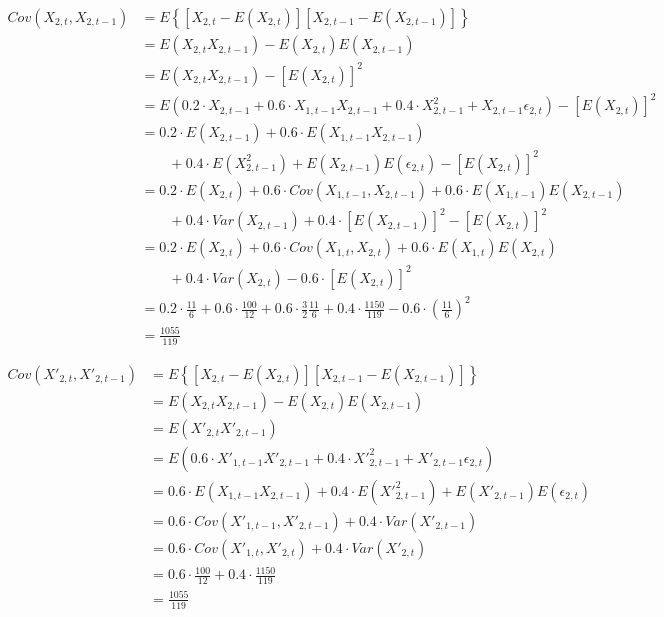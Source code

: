 \begin{solution}
\begin{equation}
\begin{aligned}
Cov(X_{2,t},X_{2,t-1}) 	& = E\left\{[X_{2,t} - E(X_{2,t})][X_{2,t-1} - E(X_{2,t-1})]\right\} \\
												& = E(X_{2,t}X_{2,t-1}) - E(X_{2,t})E(X_{2,t-1}) \\
												& = E(X_{2,t}X_{2,t-1}) - [E(X_{2,t})]^2 \\
												& = E\left(0.2 \cdot X_{2,t-1} + 0.6 \cdot X_{1,t-1}X_{2,t-1}
													+ 0.4 \cdot X_{2,t-1}^2 + X_{2,t-1}\epsilon_{2,t} \right) - [E(X_{2,t})]^2 \\
												& = 0.2 \cdot E(X_{2,t-1}) + 0.6 \cdot E(X_{1,t-1}X_{2,t-1}) \\
				         & \qquad + 0.4 \cdot E(X_{2,t-1}^2) + E(X_{2,t-1})E(\epsilon_{2,t}) - [E(X_{2,t})]^2 \\
												& = 0.2 \cdot E(X_{2,t}) + 0.6 \cdot Cov(X_{1,t-1},X_{2,t-1}) + 0.6 \cdot E(X_{1,t-1})E(X_{2,t-1}) \\
								 & \qquad + 0.4 \cdot Var(X_{2,t-1}) + 0.4 \cdot [E(X_{2,t-1})]^2 - [E(X_{2,t})]^2 \\
								        & = 0.2 \cdot E(X_{2,t}) + 0.6 \cdot Cov(X_{1,t},X_{2,t}) + 0.6 \cdot E(X_{1,t})E(X_{2,t}) \\
								 & \qquad + 0.4 \cdot Var(X_{2,t}) - 0.6 \cdot [E(X_{2,t})]^2\\
												& = 0.2 \cdot \frac{11}{6} + 0.6 \cdot \frac{100}{12} + 0.6 \cdot \frac{3}{2}\frac{11}{6}
								          + 0.4 \cdot \frac{1150}{119} - 0.6 \cdot \left(\frac{11}{6}\right)^2\\
												& = \frac{1055}{119}
\end{aligned}
\end{equation}

\begin{equation}
\begin{aligned}
Cov(X'_{2,t},X'_{2,t-1}) 	& = E\left\{[X_{2,t} - E(X_{2,t})][X_{2,t-1} - E(X_{2,t-1})]\right\} \\
												& = E(X_{2,t}X_{2,t-1}) - E(X_{2,t})E(X_{2,t-1}) \\
												& = E(X'_{2,t}X'_{2,t-1}) \\
												& = E\left(0.6 \cdot X'_{1,t-1}X'_{2,t-1}
													+ 0.4 \cdot {X'}_{2,t-1}^2 + X'_{2,t-1}\epsilon_{2,t} \right)\\
												& = 0.6 \cdot E(X_{1,t-1}X_{2,t-1}) + 0.4 \cdot E({X'}_{2,t-1}^2) + E(X'_{2,t-1})E(\epsilon_{2,t})\\
												& = 0.6 \cdot Cov(X'_{1,t-1},X'_{2,t-1}) + 0.4 \cdot Var(X'_{2,t-1})\\
								        & = 0.6 \cdot Cov(X'_{1,t},X'_{2,t}) + 0.4 \cdot Var(X'_{2,t})\\
												& = 0.6 \cdot \frac{100}{12} + 0.4 \cdot \frac{1150}{119}\\
												& = \frac{1055}{119}
\end{aligned}
\end{equation}


\end{solution}
